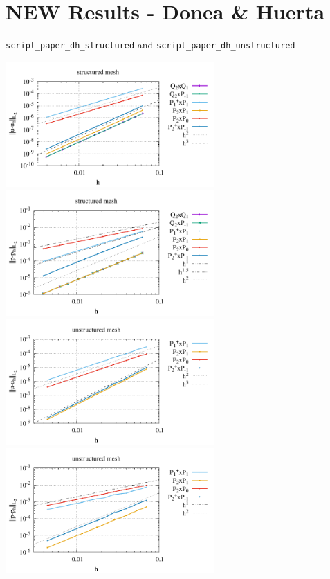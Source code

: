 \newpage
\section*{NEW Results - Donea \& Huerta}

{\tt script\_paper\_dh\_structured} and {\tt script\_paper\_dh\_unstructured}

\begin{center}
\includegraphics[width=8cm]{python_codes/fieldstone_120/paperresults/dh_structured_errorsV.pdf}
\includegraphics[width=8cm]{python_codes/fieldstone_120/paperresults/dh_structured_errorsP.pdf}\\
\includegraphics[width=8cm]{python_codes/fieldstone_120/paperresults/dh_unstructured_errorsV.pdf}
\includegraphics[width=8cm]{python_codes/fieldstone_120/paperresults/dh_unstructured_errorsP.pdf}
\end{center}

